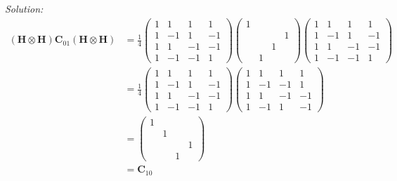 \documentclass{book}
\theoremstyle{definition}
\newcommand{\nn}{\nonumber}
\newcommand{\f}[2]{\frac{#1}{#2}}
\newcommand{\had}{\mathbf{H}}
\begin{document}
\noindent \textit{Solution:} 
\begin{align}
(\had \otimes \had) \mathbf{C}_{01} (\had \otimes \had) &=  \f{1}{4}\begin{pmatrix}
1&1&1&1\\
1&-1&1&-1\\
1&1&-1&-1\\
1&-1&-1&1
\end{pmatrix}\begin{pmatrix}
1 &&&\\&&&1\\&&1&\\&1&&
\end{pmatrix}\begin{pmatrix}
1&1&1&1\\
1&-1&1&-1\\
1&1&-1&-1\\
1&-1&-1&1
\end{pmatrix}\nn\\
&= \f{1}{4}\begin{pmatrix}
1&1&1&1\\
1&-1&1&-1\\
1&1&-1&-1\\
1&-1&-1&1
\end{pmatrix}\begin{pmatrix}
1& 1& 1& 1\\
1& -1& -1& 1\\
1& 1& -1& -1\\
1& -1& 1& -1
\end{pmatrix}\nn\\
&= \begin{pmatrix}
1&&&\\&1&&\\&&&1\\&&1&
\end{pmatrix} \nn\\
&= \mathbf{C}_{10}
\end{align}
\end{document}
